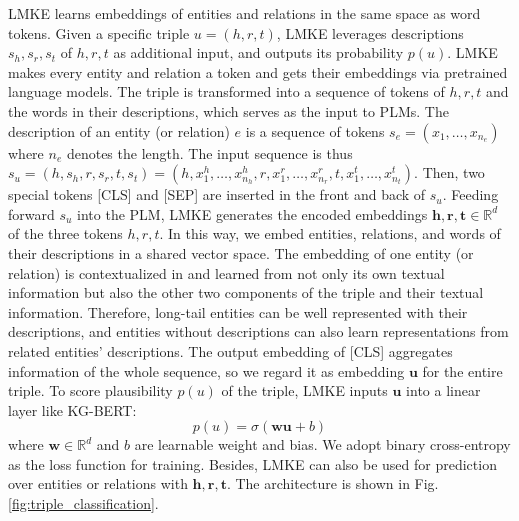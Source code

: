 \documentclass{article}
\begin{document}
LMKE learns embeddings of entities and relations in the same space as word tokens.
Given a specific triple $u=(h, r, t)$, LMKE leverages descriptions $s_{h}, s_{r}, s_{t}$ of $h, r, t$ as additional input, and outputs its probability $p(u)$.
LMKE makes every entity and relation a token and gets their embeddings via pretrained language models.
The triple is transformed into a sequence of tokens of $h, r, t$ and the words in their descriptions, which serves as the input to PLMs.
The description of an entity (or relation) $e$ is a sequence of tokens $s_{e}=(x_{1}, \ldots, x_{n_{e}})$ where $n_{e}$ denotes the length. 
The input sequence is thus 
$s_{u}=(h, s_{h}, r, s_{r}, t, s_{t})=(h, x_{1}^{h}, \ldots, x_{n_{h}}^{h}, r, x_{1}^{r}, \ldots, x_{n_{r}}^{r}, t, x_{1}^{t}, \ldots, x_{n_{t}}^{t})$.
Then, two special tokens [CLS] and [SEP] are inserted in the front and back of $s_{u}$.
Feeding forward $s_{u}$ into the PLM, 
LMKE generates the encoded embeddings $\textbf{h}, \textbf{r}, \textbf{t}\in\mathbb{R}^{d}$ of the three tokens $h, r, t$. 
In this way, we embed entities, relations, and words of their descriptions in a shared vector space. 
The embedding of one entity (or relation) is contextualized in and learned from not only its own textual information but also the other two components of the triple and their textual information.
Therefore, long-tail entities can be well represented with their descriptions, 
and entities without descriptions can also learn representations from related entities' descriptions. 
The output embedding of [CLS] aggregates information of the whole sequence, so we regard it as embedding $\textbf{u}$ for the entire triple. 
To score plausibility $p(u)$ of the triple, LMKE inputs $\textbf{u}$ into a linear layer like KG-BERT:
\begin{equation}
    p(u)= \sigma(\textbf{w}\textbf{u} + b)
\label{eq:cls}
\end{equation}
where $\textbf{w}\in\mathbb{R}^{d}$ and $b$ are learnable weight and bias. 
We adopt binary cross-entropy as the loss function for training. 
Besides,
LMKE can also be used for prediction over entities or relations with $\textbf{h}, \textbf{r}, \textbf{t}$. 
The architecture is shown in Fig. \ref{fig:triple_classification}. 
\end{document}
